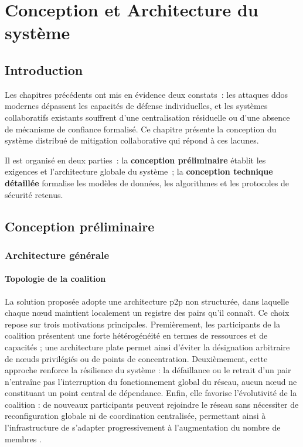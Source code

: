 \chapter{Conception et Architecture du système}
\label{chap:conception}

\section{Introduction}

Les chapitres précédents ont mis en évidence deux constats~: les attaques \gls{ddos} modernes dépassent les capacités de défense individuelles, et les systèmes collaboratifs existants souffrent d'une centralisation résiduelle ou d'une absence de mécanisme de confiance formalisé. Ce chapitre présente la conception du système distribué de mitigation collaborative qui répond à ces lacunes.

Il est organisé en deux parties~: la \textbf{conception préliminaire} établit les exigences et l'architecture globale du système~; la \textbf{conception technique détaillée} formalise les modèles de données, les algorithmes et les protocoles de sécurité retenus.

\section{Conception préliminaire}
\label{sec:conception_prelim}

\subsection{Architecture générale}
\label{sec:architecture_gen}

\subsubsection{Topologie de la coalition}
La solution proposée adopte une architecture \gls{p2p} non structurée, dans laquelle chaque nœud maintient localement un registre des pairs qu'il connaît. Ce choix repose sur trois motivations principales. Premièrement, les participants de la coalition présentent une forte hétérogénéité en termes de ressources et de capacités ; une architecture plate permet ainsi d'éviter la désignation arbitraire de nœuds privilégiés ou de points de concentration. Deuxièmement, cette approche renforce la résilience du système : la défaillance ou le retrait d'un pair n'entraîne pas l'interruption du fonctionnement global du réseau, aucun nœud ne constituant un point central de dépendance. Enfin, elle favorise l'évolutivité de la coalition : de nouveaux participants peuvent rejoindre le réseau sans nécessiter de reconfiguration globale ni de coordination centralisée, permettant ainsi à l'infrastructure de s'adapter progressivement à l'augmentation du nombre de membres \cite{lua2005survey}.

